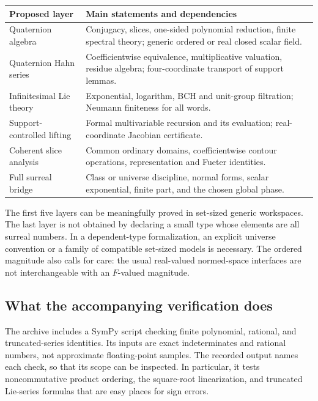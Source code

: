 \documentclass[11pt,letterpaper]{article}
\theoremstyle{definition}
\begin{document}
\begin{center}
\begin{tabular}{@{}p{}p{}@{}}
\toprule
Proposed layer & Main statements and dependencies\\
\midrule
Quaternion algebra & Conjugacy, slices, one-sided polynomial reduction, finite
spectral theory; generic ordered or real closed scalar field.\\[4pt]
Quaternion Hahn series & Coefficientwise equivalence, multiplicative valuation,
residue algebra; four-coordinate transport of support lemmas.\\[4pt]
Infinitesimal Lie theory & Exponential, logarithm, BCH and unit-group filtration;
Neumann finiteness for all words.\\[4pt]
Support-controlled lifting & Formal multivariable recursion and its evaluation;
real-coordinate Jacobian certificate.\\[4pt]
Coherent slice analysis & Common ordinary domains, coefficientwise contour
operations, representation and Fueter identities.\\[4pt]
Full surreal bridge & Class or universe discipline, normal forms, scalar
exponential, finite part, and the chosen global phase.\\
\bottomrule
\end{tabular}
\end{center}

The first five layers can be meaningfully proved in set-sized generic
workspaces. The last layer is not obtained by declaring a small type whose
elements are all surreal numbers. In a dependent-type formalization, an
explicit universe convention or a family of compatible set-sized models is
necessary. The ordered magnitude also calls for care: the usual real-valued
normed-space interfaces are not interchangeable with an $F$-valued magnitude.

\subsection{What the accompanying verification does}
The archive includes a SymPy script checking finite polynomial, rational, and
truncated-series identities. Its inputs are exact indeterminates and rational
numbers, not approximate floating-point samples. The recorded output names
each check, so that its scope can be inspected. In particular, it tests
noncommutative product ordering, the square-root linearization, and truncated
Lie-series formulas that are easy places for sign errors.
\end{document}
